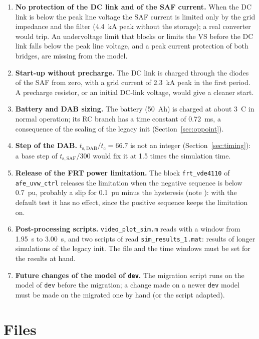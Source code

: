 \documentclass[11pt,a4paper]{scrartcl}
\newcommand{\ped}[1]{_{\mathrm{#1}}}
\newcommand{\code}[1]{\texttt{#1}}
\begin{document}
\begin{onehalfspace}
\begin{enumerate}
	\item \textbf{No protection of the DC link and of the SAF current.} When the DC link is below the peak line voltage the SAF current is limited only by the grid impedance and the filter (\SI{4.4}{kA} peak without the storage); a real converter would trip. An undervoltage limit that blocks or limits the VS before the DC link falls below the peak line voltage, and a peak current protection of both bridges, are missing from the model.
	\item \textbf{Start-up without precharge.} The DC link is charged through the diodes of the SAF from zero, with a grid current of \SI{2.3}{kA} peak in the first period. A precharge resistor, or an initial DC-link voltage, would give a cleaner start.
	\item \textbf{Battery and DAB sizing.} The battery (\SI{50}{Ah}) is charged at about \SI{3}{C} in normal operation; its RC branch has a time constant of \SI{0.72}{ms}, a consequence of the scaling of the legacy init (Section~\ref{sec:oppoint}).
	\item \textbf{Step of the DAB.} $t\ped{s,DAB}/t\ped{c} = 66.7$ is not an integer (Section~\ref{sec:timing}): a base step of $t\ped{s,SAF}/300$ would fix it at 1.5 times the simulation time.
	\item \textbf{Release of the FRT power limitation.} The block \code{frt\_vde4110} of \code{afe\_uvw\_ctrl} releases the limitation when the negative sequence is below \SI{0.7}{pu}, probably a slip for \SI{0.1}{pu} minus the hysteresis (note \cite{afe_uvw_note}): with the default test it has no effect, since the positive sequence keeps the limitation on.
	\item \textbf{Post-processing scripts.} \code{video\_plot\_sim.m} reads  with a window from \SI{1.95}{s} to \SI{3.00}{s}, and two scripts of  read \code{sim\_results\_1.mat}: results of longer simulations of the legacy init. The file and the time windows must be set for the results at hand.
	\item \textbf{Future changes of the model of \code{dev}.} The migration script runs on the model of \code{dev} before the migration; a change made on a newer \code{dev} model must be made on the migrated one by hand (or the script adapted).
\end{enumerate}

\appendix
\section{Files}
\label{sec:files}


\end{onehalfspace}
\end{document}
